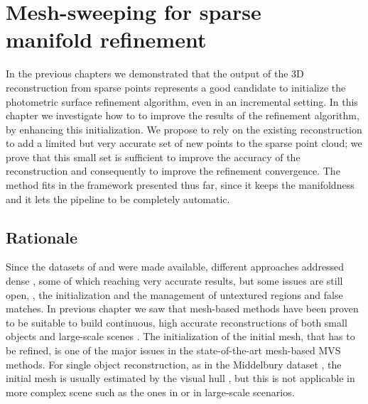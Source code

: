 \chapter[Mesh-sweeping for sparse manifold refinement]{Mesh-sweeping for sparse \\manifold refinement}
\label{ch:sweeping}

In the previous chapters we demonstrated that the output of the 3D reconstruction from sparse points represents a good candidate to initialize the photometric surface refinement algorithm, even in an incremental setting. 
In this chapter we investigate how to to improve the results of the refinement algorithm, by enhancing this initialization. 
We propose to rely on the existing reconstruction to add a limited but very accurate set of new points to the sparse point cloud; we prove that this small set is sufficient to improve the accuracy of the reconstruction and consequently to improve the refinement convergence. 
The method fits in the framework presented thus far, since it keeps the manifoldness and it lets the pipeline to be completely automatic.


\minitoc
\newpage

\section{Rationale}


Since the datasets of \cite{seitz_et_al06} and \cite{strecha2008} were made available, different approaches addressed dense \mvs, some of which reaching very accurate results, but some issues are still open, \eg, the initialization and the management of untextured regions and false matches.
In previous chapter we saw that mesh-based methods have been proven to be suitable to build continuous, high accurate reconstructions of both small objects and large-scale scenes \cite{hiep2009towards,vu_et_al_2012,salman2010surface}. 
The initialization of the initial mesh, that has to be refined, is one of the major issues in the state-of-the-art mesh-based MVS methods. For single object reconstruction, as in the Middelbury dataset \cite{seitz_et_al06}, the initial mesh is usually estimated by the visual hull \cite{laurentini1994visual}, but this is not applicable in more complex scene such as the ones in \cite{strecha2008} or in large-scale scenarios.

